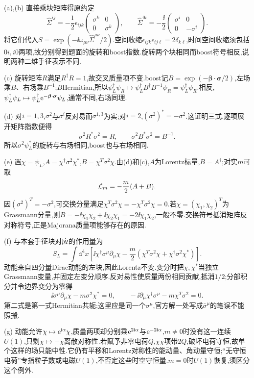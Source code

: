 \begin{solution}
(a),(b) 直接乘块矩阵得原约定
\[
 \widehat\Sigma^{ij}=-\frac12\epsilon_{ijk}
 \begin{pmatrix}\sigma^k&0\\0&\sigma^k\end{pmatrix},\qquad
 \widehat\Sigma^{0i}=-\frac\ii2\begin{pmatrix}\sigma^i&0\\0&-\sigma^i\end{pmatrix}.
\]
将它们代入$S=\exp(-\ii\omega_{\mu\nu}\widehat\Sigma^{\mu\nu}/2)$.空间收缩$\epsilon_{ijk}\epsilon_{ij\ell}=2\delta_{k\ell}$,时间空间收缩须包括$0i,i0$两项,故分别得到题面的旋转和boost指数.旋转两个块相同而boost符号相反,说明两种二维手征表示不同.

(c) 旋转矩阵$R$满足$R^\dagger R=1$,故交叉质量项不变.boost记$B=\exp(-\boldsymbol\beta\cdot\boldsymbol\sigma/2)$,左场乘$B$、右场乘$B^{-1}$;$B$Hermitian,所以$\psi_L^\dagger\psi_R\mapsto\psi_L^\dagger B^\dagger B^{-1}\psi_R=\psi_L^\dagger\psi_R$.相反,$\psi_L^\dagger\psi_L\mapsto\psi_L^\dagger\mathrm e^{-\boldsymbol\beta\cdot\boldsymbol\sigma}\psi_L$,通常不同,右场同理.

(d) 对$i=1,3$,$\sigma^2$与$\sigma^i$反对易而$\sigma^{1,3}$为实;对$i=2$,$(\sigma^2)^*=-\sigma^2$.这证明三式.逐项展开矩阵指数便得
\[
 \sigma^2R^*\sigma^2=R,\qquad
 \sigma^2B^*\sigma^2=B^{-1}.
\]
所以$\sigma^2\psi_L^*$的旋转与右场相同,boost也与右场相同.

(e) 置$\chi=\psi_L$,$A=\chi^\dagger\sigma^2\chi^*$,$B=\chi^T\sigma^2\chi$.由(d)和(c),$A$为Lorentz标量,$B=A^\dagger$;对实$m$可取
\[
 \mathcal L_m=-\frac m2(A+B).
\]
因$(\sigma^2)^T=-\sigma^2$,可交换分量满足$\chi^T\sigma^2\chi=-\chi^T\sigma^2\chi=0$.若$\chi=(\chi_1,\chi_2)^T$为Grassmann分量,则$B=-\ii\chi_1\chi_2+\ii\chi_2\chi_1=-2\ii\chi_1\chi_2$,一般不零.交换符号抵消矩阵反对称符号,正是Majorana质量项能够存在的原因.

(f) 与本套手征块对应的作用量为
\[
 S_L=\int\dd^4x\left[\ii\chi^\dagger\sigma^\mu\partial_\mu\chi
 -\frac m2(\chi^T\sigma^2\chi+\chi^\dagger\sigma^2\chi^*)\right].
\]
动能来自四分量Dirac动能的左块,因此Lorentz不变.变分时把$\chi,\chi^*$当独立Grassmann变量,并固定左变分顺序.反对易性使质量两份相同贡献,抵消$1/2$;分部积分并令边界变分为零得
\[
 \ii\sigma^\mu\partial_\mu\chi-m\sigma^2\chi^*=0,
 \qquad-\ii\partial_\mu\chi^\dagger\sigma^\mu-m\chi^T\sigma^2=0.
\]
第二式是第一式Hermitian共轭;这里应是同一个$\sigma^\mu$,官方解一处写成$\bar\sigma^\mu$的笔误不能照搬.

(g) 动能允许$\chi\mapsto\mathrm e^{\mathrm i\alpha}\chi$,质量两项却分别乘$\mathrm e^{2\mathrm i\alpha}$与$\mathrm e^{-2\mathrm i\alpha}$,$m\ne0$时没有这一连续$U(1)$,只剩$\chi\mapsto-\chi$离散对称性.若赋予非零电荷$Q$,$\chi\chi$项带$2Q$,破坏电荷守恒,故单个这样的场只能中性.它仍有平移和Lorentz对称性的能动量、角动量守恒;“无守恒电荷”专指粒子数或电磁$U(1)$,不否定这些时空守恒量.$m=0$时$U(1)$恢复,须区分这个例外.
\end{solution}


